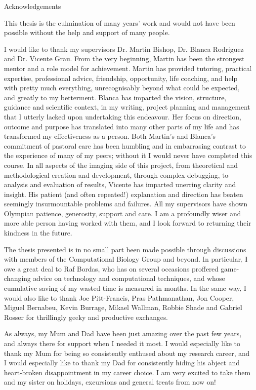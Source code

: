 \vspace*{20mm}
{
\Large\bf
\begin{center}
Acknowledgements
\end{center}
}

This thesis is the culmination of many years' work and would not have been possible without the help and support of many people. 

I would like to thank my supervisors Dr. Martin Bishop, Dr. Blanca Rodriguez and Dr. Vicente Grau. From the very beginning, Martin has been the strongest mentor and a role model for achievement. Martin has provided tutoring, practical expertise, professional advice, friendship, opportunity, life coaching, and help with pretty much everything, unrecognisably beyond what could be expected, and greatly to my betterment. Blanca has imparted the vision, structure, guidance and scientific context, in my writing, project planning and management that I utterly lacked upon undertaking this endeavour. Her focus on direction, outcome and purpose has translated into many other parts of my life and has transformed my effectiveness as a person. Both Martin's and Blanca's commitment of pastoral care has been humbling and in embarrasing contrast to the experience of many of my peers; without it I would never have completed this course. In all aspects of the imaging side of this project, from theoretical and methodological creation and development, through complex debugging, to analysis and evaluation of results, Vicente has imparted unerring clarity and insight. His patient (and often repeated!) explanation and direction has beaten seemingly insurmountable problems and failures. All my supervisors have shown Olympian patience, generosity, support and care. I am a profoundly wiser and more able person having worked with them, and I look forward to returning their kindness in the future.

The thesis presented is in no small part been made possible through discussions with members of the Computational Biology Group and beyond. In particular, I owe a great deal to Raf Bordas, who has on several occasions proffered game-changing advice on technology and computational techniques, and whose cumulative saving of my wasted time is measured in months. In the same way, I would also like to thank Joe Pitt-Francis, Pras Pathmanathan, Jon Cooper, Miguel Bernabeu, Kevin Burrage, Mikael Wallman, Robbie Shade and Gabriel Rosser for thrillingly geeky and productive exchanges.

As always, my Mum and Dad have been just amazing over the past few years, and always there for support when I needed it most. I would especially like to thank my Mum for being so consistently enthused about my research career, and I would especially like to thank my Dad for consistently hiding his abject and heart-broken disappointment in my career choice. I am very excited to take them and my sister on holidays, excursions and general treats from now on!

